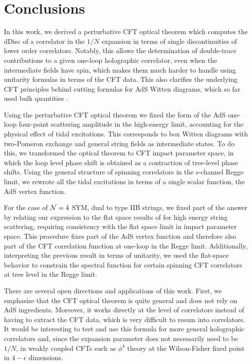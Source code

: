 
\section{Conclusions}
\label{sec:conclusions}
In this work, we  derived a perturbative CFT optical theorem which computes the dDisc of a correlator in the $1/N$ expansion in terms of single discontinuities of lower order correlators. Notably, this allows the determination of double-trace contributions to a given one-loop holographic correlator, even when the intermediate fields have spin, which makes them much harder to handle  using unitarity formulas in terms of the CFT data. This also clarifies the underlying CFT principles behind cutting formulas for AdS Witten diagrams, which so far used bulk quantities \cite{Meltzer:2019nbs,Meltzer:2020qbr}.

Using the perturbative CFT optical theorem we fixed the form of the AdS one-loop four-point scattering amplitude in the high-energy limit, accounting for the physical effect of tidal excitations.  This corresponds to box Witten diagrams with two-Pomeron exchange and general string fields as intermediate states. To do this, we transformed the optical theorem to CFT impact parameter space, in which the loop level phase shift is obtained as a contraction of tree-level phase shifts.
Using the general structure of spinning correlators in the s-channel Regge limit, we rewrote all the tidal excitations in terms of a single scalar function, the AdS vertex function.

For the case of ${\cal N}=4$ SYM, dual to type IIB strings, we fixed part of the answer by relating our expression to the flat space results of \cite{Amati:1987wq,Amati:1987uf,Amati:1988tn} for high energy string scattering, requiring consistency with the flat space limit in impact parameter space. This procedure fixes part of the AdS vertex function and therefore also part of the CFT correlation function at one-loop in the Regge limit.
Additionally, interpreting the previous result in terms of unitarity, we used the flat-space behavior  to constrain the spectral function for certain spinning CFT correlators  at tree level in the Regge limit. 


There are several open directions and applications of this work.
First, we emphasize that the CFT optical theorem is quite general and does not rely on AdS ingredients.
Moreover,   it works directly at the level of correlators instead of having to extract the CFT data, which is very difficult to resum into correlators. It would be interesting to test and use this formula for more general holographic correlators and, since the expansion parameter does not necessarily need to be $1/N$, in weakly coupled CFTs such as $\phi^4$ theory at the Wilson-Fisher fixed point in $4-\epsilon$ dimensions. 

